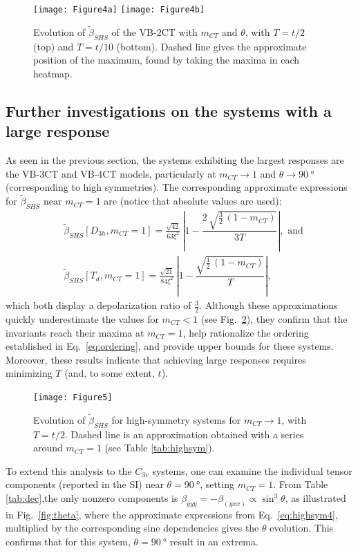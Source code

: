 \documentclass[journal=jpcafh]{achemso}
\begin{document}
\begin{figure}[!h]
	\texttt{[image: Figure4a]}
	\texttt{[image: Figure4b]}
	\caption{Evolution of $\tilde\beta_{SHS}$  of the VB-2CT with $m_{CT}$ and $\theta$, with $T=t/2$ (top) and $T=t/10$ (bottom). Dashed line gives the approximate position of the maximum, found by taking the maxima in each heatmap.}
	\label{fig:3sttheta}
\end{figure}

\clearpage
\subsection{Further investigations on the systems with a large response}

As seen in the previous section, the systems exhibiting the largest responses are the VB-3CT and VB-4CT models, particularly at $m_{CT} \to 1$ and $\theta \to \SI{90}{\degree}$ (corresponding to high symmetries). The corresponding approximate expressions for $\tilde\beta_{SHS}$ near $m_{CT} = 1$ are (notice that absolute values are used):\begin{align}
	&\tilde\beta_{SHS}[D_{3h}, m_{CT}=1] = \frac{\sqrt{42}}{63\xi^2}\,\left|1-\dfrac{2\,\sqrt{\frac{3}{2}\,(1-m_{CT})}}{3T}\right|, \text{ and}\label{eq:highsym4}\\ &\tilde\beta_{SHS}[T_d, m_{CT}=1]  = \frac{\sqrt{21}}{84\xi^2}\,\left|1-\dfrac{\sqrt{\frac{1}{2}\,(1-m_{CT})}}{T}\right|,
\end{align}
which both display a depolarization ratio of $\frac{3}{2}$.
Although these approximations quickly underestimate the values for $m_{CT} < 1$ (see Fig.~\ref{fig:series}), they confirm that the invariants reach their maxima at $m_{CT} = 1$, help rationalize the ordering established in Eq.~\eqref{eq:ordering}, and provide upper bounds for these systems. 
Moreover, these results indicate that achieving large responses requires minimizing $T$ (and, to some extent, $t$).

\begin{figure}[!h]
	\texttt{[image: Figure5]}
	\caption{Evolution of $\tilde\beta_{SHS}$ for high-symmetry systems for $m_{CT}\to 1$, with $T=t/2$. Dashed line is an approximation obtained with a series around $m_{CT}=1$ (see Table \ref{tab:highsym}).}
	\label{fig:series}
\end{figure}

\clearpage

To extend this analysis to the $C_{3v}$ systems, one can examine the individual tensor components (reported in the SI) near $\theta = \SI{90}{\degree}$, setting $m_{CT} = 1$. From Table \ref{tab:dec},the only nonzero components is $\beta_{yyy} = -\beta_{(yxx)} \propto \sin^3\theta$, as illustrated in Fig.~\ref{fig:theta}, where the approximate expressions from Eq.~\eqref{eq:highsym4}, multiplied by the corresponding sine dependencies gives the $\theta$ evolution. This confirms that for this system, $\theta=\SI{90}{\degree}$ result in an extrema.
\end{document}
